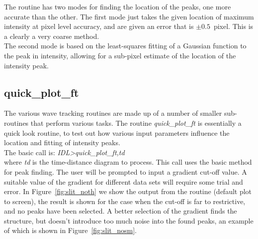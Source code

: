 \documentclass{article}
\begin{document}
\smallskip
The routine has two modes for finding the location of the peaks, one more accurate than the other. The first mode just takes the given location of maximum intensity at pixel level accuracy, and are given an error that is $\pm0.5$~pixel. This is a clearly a very coarse method.\\

 The second mode is based on the least-squares fitting of a Gaussian function to the peak in intensity, allowing for a sub-pixel estimate of the location of the intensity peak. \\

\smallskip

\subsection{{quick\_plot\_ft} }
The various wave tracking routines are made up of a number of smaller sub-routines that perform various tasks. The routine \textit{quick\_plot\_ft} is essentially a quick look routine, to test out how various input parameters influence the location and fitting of intensity peaks.\\


The basic call is: \textit{IDL\textgreater quick\_plot\_ft,td} \\

where \textit{td} is the time-distance diagram to process. This call uses the basic method for peak finding. The user will be prompted to input a gradient cut-off value. A suitable value of the gradient for different data sets will require some trial and error. In Figure~\ref{fig:slit_noth} we show the output from the routine (default plot to screen), the result is shown for the case when the cut-off is far to restrictive, and no peaks have been selected. A better selection of the gradient finds the structure, but doesn't introduce too much noise into the found peaks, an example of which is shown in Figure~\ref{fig:slit_nosm}. \\
\end{document}
